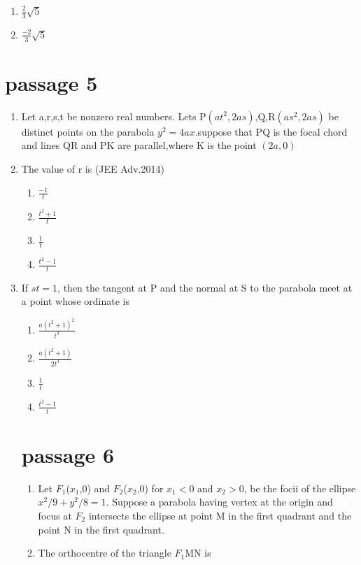 \documentclass[journal,12pt,twocolumn]{IEEEtran}
\theoremstyle{remark}
\begin{document}
\begin{enumerate}
\begin{enumerate}
\begin{enumerate}
    \item $\frac{2}{3}\sqrt{5}$
    
    \item $\frac{-2}{3}\sqrt{5}$
\end{enumerate}
\section{passage 5}
\begin{enumerate}
\item[]  Let a,r,s,t be nonzero real numbers. Lets P$(at^2,2as)$,Q,R$(as^2,2as)$ be distinct points on the parabola $y^2=4ax$.suppose that PQ is the focal chord and lines QR and PK are parallel,where K is the point $(2a,0)$
\item The value of r is 
\hfill(JEE Adv.2014)
\begin{enumerate}
    \item $\frac{-1}{t}$\\ 
    \item $\frac{t^2+1}{t}$\\
    \item $\frac{1}{t}$\\
    \item $\frac{t^2-1}{t}$
\end{enumerate}
\item If $st=1$, then the tangent at P and the normal at S to the
parabola meet at a point whose ordinate is 
\begin{enumerate}
    \item $\frac{a(t^2+1)^2}{t^3}$\\
    \item $\frac{a(t^2+1)}{2t^3}$\\
    \item $\frac{1}{t}$\\
    \item $\frac{t^2-1}{t}$
\end{enumerate}
\section{passage 6}
\begin{enumerate}
\item[]  Let ${F_1}$($x_1$,0) and  ${F_2}$($x_2$,0) for $x_1<0$ and $x_2>0$, be the focii of the ellipse $x^2/9 +y^2/8 =1$. Suppose a parabola having vertex at the origin and focus at $F_2$ intersects the ellipse at point M in the first quadrant and the point N in the first quadrant.
\item The orthocentre of the triangle $F_1$MN is


\end{enumerate}
\end{enumerate}
\end{enumerate}
\end{enumerate}
\end{document}
